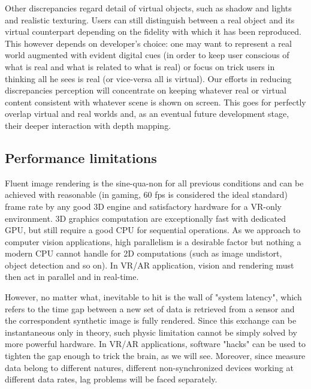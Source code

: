 Other discrepancies regard detail of virtual objects, such as shadow and lights and realistic texturing. Users can still distinguish between a real object and its virtual counterpart depending on the fidelity with which it has been reproduced. This however depends on developer's choice: one may want to represent a real world augmented with evident digital cues (in order to keep user conscious of what is real and what is related to what is real) or focus on trick users in thinking all he sees is real (or vice-versa all is virtual). Our efforts in reducing discrepancies perception will concentrate on keeping whatever real or virtual content consistent with whatever scene is shown on screen. This goes for perfectly overlap virtual and real worlds and, as an eventual future development stage, their deeper interaction with depth mapping.

\subsection{Performance limitations}
Fluent image rendering is the sine-qua-non for all previous conditions and can be achieved with reasonable (in gaming, 60 fps is considered the ideal standard) frame rate by any good 3D engine and satisfactory hardware for a VR-only environment. 3D graphics computation are exceptionally fast with dedicated GPU, but still require a good CPU for sequential operations. As we approach to computer vision applications, high parallelism is a desirable factor but nothing a modern CPU cannot handle for 2D computations (such as image undistort, object detection and so on). In VR/AR application, vision and rendering must then act in parallel and in real-time.

However, no matter what, inevitable to hit is the wall of "system latency", which refers to the time gap between a new set of data is retrieved from a sensor and the correspondent synthetic image is fully rendered. Since this exchange can be instantaneous only in theory, such physic limitation cannot be simply solved by more powerful hardware. In VR/AR applications, software "hacks" can be used to tighten the gap enough to trick the brain, as we will see. Moreover, since measure data belong to different natures, different non-synchronized devices working at different data rates, lag problems will be faced separately. 

